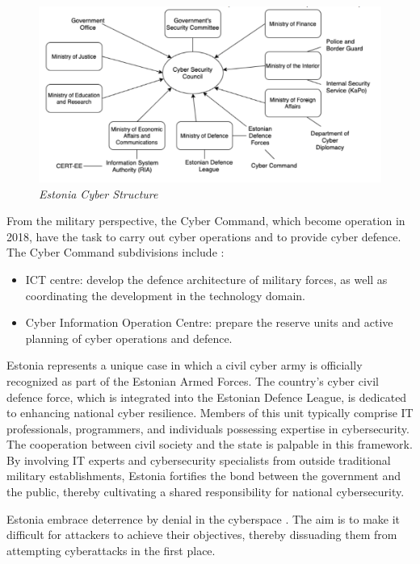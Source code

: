 \begin{figure}[H]
    \centering
    \includegraphics[width=1\textwidth]{Images/estonia.png}
    \caption{\textit{Estonia Cyber Structure}}
    \label{fig:estonia}
\end{figure}

From the military perspective, the Cyber Command, which become operation in 2018, have the task to carry out cyber operations and to provide cyber defence. The Cyber Command subdivisions include \autocite{defenceforces_2023_cyber}: 
\begin{itemize}
    \item ICT centre: develop the defence architecture of military forces, as well as coordinating the development in the technology domain. 
    \item Cyber Information Operation Centre: prepare the reserve units and active planning of cyber operations and defence.
\end{itemize}

Estonia represents a unique case in which a civil cyber army is officially recognized as part of the Estonian Armed Forces. The country's cyber civil defence force, which is integrated into the Estonian Defence League, is dedicated to enhancing national cyber resilience. Members of this unit typically comprise IT professionals, programmers, and individuals possessing expertise in cybersecurity. The cooperation between civil society and the state is palpable in this framework. By involving IT experts and cybersecurity specialists from outside traditional military establishments, Estonia fortifies the bond between the government and the public, thereby cultivating a shared responsibility for national cybersecurity.

Estonia embrace deterrence by denial in the cyberspace \autocite{oh_2019_exploring}. The aim is to make it difficult for attackers to achieve their objectives, thereby dissuading them from attempting cyberattacks in the first place. 


